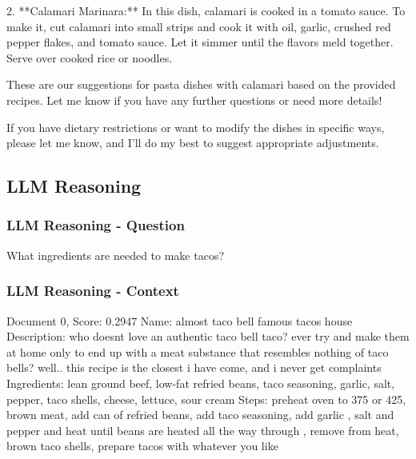 \documentclass[a4paper,11pt]{article}
\begin{document}
2. **Calamari Marinara:** In this dish, calamari is cooked in a tomato sauce. To make it, cut calamari into small strips
and cook it with oil, garlic, crushed red pepper flakes, and tomato sauce. Let it simmer until the flavors meld together.
Serve over cooked rice or noodles.

These are our suggestions for pasta dishes with calamari based on the provided recipes. Let me know if you have any further questions or need more details!

If you have dietary restrictions or want to modify the dishes in specific ways, please let me know, and I'll do my best to suggest appropriate adjustments.

\subsection{LLM Reasoning}

\subsubsection{LLM Reasoning - Question}
What ingredients are needed to make tacos?

\subsubsection{LLM Reasoning - Context}
Document 0, Score: 0.2947
Name: almost taco bell famous tacos house
Description: who doesnt love an authentic taco bell taco?  ever try and make them at home only to end up with a meat substance that resembles nothing of taco bells? well.. this recipe is the closest i have come, and i never get complaints 
Ingredients: lean ground beef, low-fat refried beans, taco seasoning, garlic, salt, pepper, taco shells, cheese, lettuce, sour cream
Steps: preheat oven to 375 or 425, brown meat, add can of refried beans, add taco seasoning, add garlic , salt and pepper and heat until beans are heated all the way through , remove from heat, brown taco shells, prepare tacos with whatever you like
\end{document}
